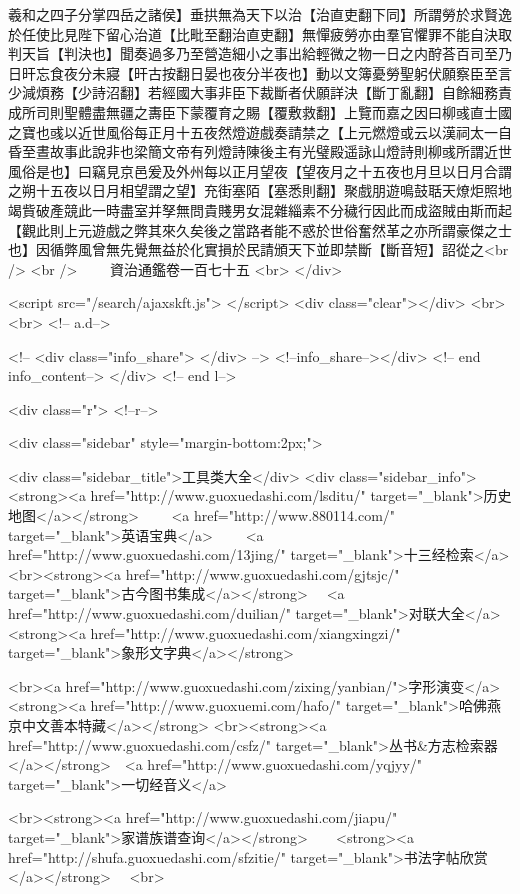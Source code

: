 羲和之四子分掌四岳之諸侯】垂拱無為天下以治【治直吏翻下同】所謂勞於求賢逸於任使比見陛下留心治道【比毗至翻治直吏翻】無憚疲勞亦由羣官懼罪不能自決取判天旨【判決也】聞奏過多乃至營造細小之事出給輕微之物一日之内酧荅百司至乃日旰忘食夜分未寢【旰古按翻日晏也夜分半夜也】動以文簿憂勞聖躬伏願察臣至言少減煩務【少詩沼翻】若經國大事非臣下裁斷者伏願詳決【斷丁亂翻】自餘細務責成所司則聖體盡無疆之夀臣下蒙覆育之賜【覆敷救翻】上覽而嘉之因曰柳彧直士國之寶也彧以近世風俗每正月十五夜然燈遊戲奏請禁之【上元燃燈或云以漢祠太一自昏至晝故事此說非也梁簡文帝有列燈詩陳後主有光璧殿遥詠山燈詩則柳彧所謂近世風俗是也】曰竊見京邑爰及外州每以正月望夜【望夜月之十五夜也月旦以日月合謂之朔十五夜以日月相望謂之望】充街塞陌【塞悉則翻】聚戲朋遊鳴鼓聒天燎炬照地竭貲破產競此一時盡室并孥無問貴賤男女混雜緇素不分穢行因此而成盜賊由斯而起【觀此則上元遊戲之弊其來久矣後之當路者能不惑於世俗奮然革之亦所謂豪傑之士也】因循弊風曾無先覺無益於化實損於民請頒天下並即禁斷【斷音短】詔從之<br />
<br />
　　資治通鑑卷一百七十五  <br>
   </div> 

<script src="/search/ajaxskft.js"> </script>
 <div class="clear"></div>
<br>
<br>
 <!-- a.d-->

 <!--
<div class="info_share">
</div> 
-->
 <!--info_share--></div>   <!-- end info_content-->
  </div> <!-- end l-->

<div class="r">   <!--r-->



<div class="sidebar"  style="margin-bottom:2px;">

 
<div class="sidebar_title">工具类大全</div>
<div class="sidebar_info">
<strong><a href="http://www.guoxuedashi.com/lsditu/" target="_blank">历史地图</a></strong>　　
<a href="http://www.880114.com/" target="_blank">英语宝典</a>　　
<a href="http://www.guoxuedashi.com/13jing/" target="_blank">十三经检索</a>　
<br><strong><a href="http://www.guoxuedashi.com/gjtsjc/" target="_blank">古今图书集成</a></strong>　
<a href="http://www.guoxuedashi.com/duilian/" target="_blank">对联大全</a>　<strong><a href="http://www.guoxuedashi.com/xiangxingzi/" target="_blank">象形文字典</a></strong>　

<br><a href="http://www.guoxuedashi.com/zixing/yanbian/">字形演变</a>　　<strong><a href="http://www.guoxuemi.com/hafo/" target="_blank">哈佛燕京中文善本特藏</a></strong>
<br><strong><a href="http://www.guoxuedashi.com/csfz/" target="_blank">丛书&方志检索器</a></strong>　<a href="http://www.guoxuedashi.com/yqjyy/" target="_blank">一切经音义</a>　　

<br><strong><a href="http://www.guoxuedashi.com/jiapu/" target="_blank">家谱族谱查询</a></strong>　　<strong><a href="http://shufa.guoxuedashi.com/sfzitie/" target="_blank">书法字帖欣赏</a></strong>　
<br>

